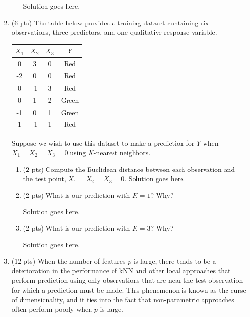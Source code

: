 \documentclass[a4paper]{article}
\theoremstyle{definition}
\newenvironment{soln}{
    \leavevmode\color{blue}\ignorespaces
}{}
\begin{document}
\begin{enumerate}
\begin{enumerate}
	\begin{soln}  Solution goes here. \end{soln}

    
\end{enumerate}

\item (6 pts) The table below provides a training dataset containing six observations, three predictors, and one qualitative response variable.

\begin{center}
	\begin{tabular}{ c  c  c  c}
		\hline
		$X_{1}$ & $X_{2}$ & $X_{3}$ & $Y$ \\ \hline
		0 & 3 & 0 & Red \\
		-2 & 0 & 0 & Red \\
		0 & -1 & 3 & Red \\
		0 & 1 & 2 & Green \\
		-1 & 0 & 1 & Green \\
		1 & -1 & 1 & Red  \\
		\hline
	\end{tabular}
\end{center}

Suppose we wish to use this dataset to make a prediction for $Y$ when $X_{1} = X_{2} = X_{3} = 0$ using $K$-nearest neighbors.

\begin{enumerate}
	\item (2 pts) Compute the Euclidean distance between each observation and the test point, $X_{1} = X_{2} = X_{3}=0$.
	\begin{soln}  Solution goes here. \end{soln}
	\item (2 pts) What is our prediction with $K=1$? Why?
	
	\begin{soln}  Solution goes here. \end{soln}
	
	\item (2 pts) What is our prediction with $K=3$? Why?
	
	\begin{soln}  Solution goes here. \end{soln}

\end{enumerate}

\item (12 pts) When the number of features $p$ is large, there tends to be a deterioration in the performance of kNN and other local approaches that perform prediction using only observations that are near the test observation for which a prediction must be made. This phenomenon is known as the curse of dimensionality, and it ties into the fact that non-parametric approaches often perform poorly when $p$ is large.


\end{enumerate}
\end{document}
